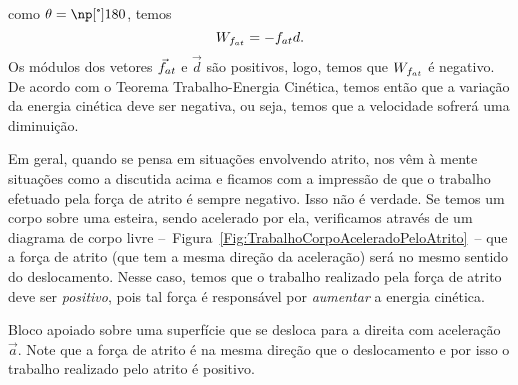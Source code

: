 \noindent{}como $\theta = \degree{180}$, temos
\begin{equation}
  W_{f_{at}} = -f_{at} d.
\end{equation}
%
Os módulos dos vetores $\vec{f}_{at}$ e $\vec{d}$ são positivos, logo, temos que $W_{f_{at}}$ é negativo. De acordo com o Teorema Trabalho-Energia Cinética, temos então que a variação da energia cinética deve ser negativa, ou seja, temos que a velocidade sofrerá uma diminuição. 

Em geral, quando se pensa em situações envolvendo atrito, nos vêm à mente situações como a discutida acima e ficamos com a impressão de que o trabalho efetuado pela força de atrito é sempre negativo. Isso não é verdade. Se temos um corpo sobre uma esteira, sendo acelerado por ela, verificamos através de um diagrama de corpo livre --~Figura~\ref{Fig:TrabalhoCorpoAceleradoPeloAtrito}~-- que a força de atrito (que tem a mesma direção da aceleração) será no mesmo sentido do deslocamento. Nesse caso, temos que o trabalho realizado pela força de atrito deve ser \emph{positivo}, pois tal força é responsável por \emph{aumentar} a energia cinética.
\begin{marginfigure}
\centering
{}
\caption{Bloco apoiado sobre uma superfície que se desloca para a direita com aceleração $\vec{a}$. Note que a força de atrito é na mesma direção que o deslocamento e por isso o trabalho realizado pelo atrito é positivo. \label{Fig:TrabalhoCorpoAceleradoPeloAtrito}}
\end{marginfigure}

